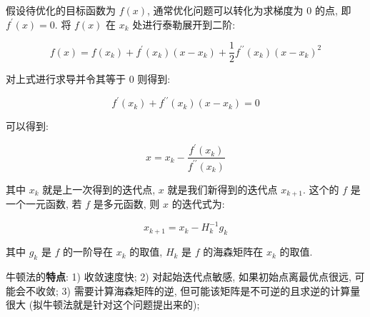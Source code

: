 假设待优化的目标函数为 $f(x)$, 通常优化问题可以转化为求梯度为 0 的点, 即 $f^{\prime}(x) = 0$. 将 $f(x)$ 在 $x_k$ 处进行泰勒展开到二阶:

$$
f(x)=f\left(x_{k}\right)+f^{\prime}\left(x_{k}\right)\left(x-x_{k}\right)+\frac{1}{2} f^{\prime \prime}\left(x_{k}\right)\left(x-x_{k}\right)^{2}
$$

对上式进行求导并令其等于 0 则得到:

$$
f^{\prime}\left(x_{k}\right)+f^{\prime \prime}\left(x_{k}\right)\left(x-x_{k}\right)=0
$$

可以得到:

$$
x=x_{k}-\frac{f^{\prime}\left(x_{k}\right)}{f^{\prime \prime}\left(x_{k}\right)}
$$

其中 $x_k$ 就是上一次得到的迭代点, $x$ 就是我们新得到的迭代点 $x_{k+1}$. 这个的 $f$ 是一个一元函数, 若 $f$ 是多元函数, 则 $x$ 的迭代式为:

$$
x_{k+1} = x_k - H^{-1}_k g_k
$$

其中 $g_k$ 是 $f$ 的一阶导在 $x_k$ 的取值, $H_k$ 是 $f$ 的海森矩阵在 $x_k$ 的取值.

牛顿法的\textbf{特点}: 1) 收敛速度快; 2) 对起始迭代点敏感, 如果初始点离最优点很远, 可能会不收敛; 3) 需要计算海森矩阵的逆, 但可能该矩阵是不可逆的且求逆的计算量很大 (拟牛顿法就是针对这个问题提出来的); 